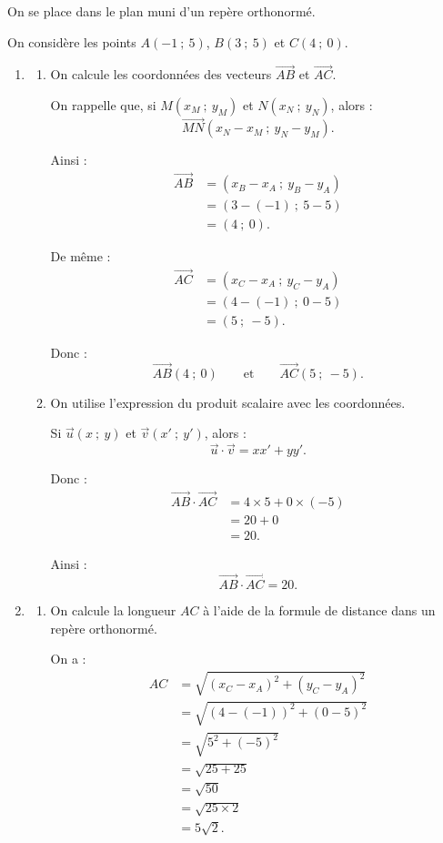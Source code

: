 On se place dans le plan muni d'un repère orthonormé.

On considère les points $A(-1\ ;\ 5)$, $B(3\ ;\ 5)$ et $C(4\ ;\ 0)$.

\begin{enumerate}
\item \begin{enumerate}
\item On calcule les coordonnées des vecteurs $\overrightarrow{AB}$ et $\overrightarrow{AC}$.

On rappelle que, si $M(x_M\ ;\ y_M)$ et $N(x_N\ ;\ y_N)$, alors :
\[
\overrightarrow{MN}(x_N-x_M\ ;\ y_N-y_M).
\]

Ainsi :
\begin{align*}
\overrightarrow{AB}
&=(x_B-x_A\ ;\ y_B-y_A)\\
&=(3-(-1)\ ;\ 5-5)\\
&=(4\ ;\ 0).
\end{align*}

De même :
\begin{align*}
\overrightarrow{AC}
&=(x_C-x_A\ ;\ y_C-y_A)\\
&=(4-(-1)\ ;\ 0-5)\\
&=(5\ ;\ -5).
\end{align*}

Donc :
\[
\overrightarrow{AB}(4\ ;\ 0)
\qquad \text{et} \qquad
\overrightarrow{AC}(5\ ;\ -5).
\]

\item On utilise l'expression du produit scalaire avec les coordonnées.

Si $\vec u(x\ ;\ y)$ et $\vec v(x'\ ;\ y')$, alors :
\[
\vec u\cdot \vec v=xx'+yy'.
\]

Donc :
\begin{align*}
\overrightarrow{AB}\cdot\overrightarrow{AC}
&=4\times 5+0\times (-5)\\
&=20+0\\
&=20.
\end{align*}

Ainsi :
\[
\overrightarrow{AB}\cdot\overrightarrow{AC}=20.
\]
\end{enumerate}

\item \begin{enumerate}
\item On calcule la longueur $AC$ à l'aide de la formule de distance dans un repère orthonormé.

On a :
\begin{align*}
AC
&=\sqrt{(x_C-x_A)^2+(y_C-y_A)^2}\\
&=\sqrt{(4-(-1))^2+(0-5)^2}\\
&=\sqrt{5^2+(-5)^2}\\
&=\sqrt{25+25}\\
&=\sqrt{50}\\
&=\sqrt{25\times 2}\\
&=5\sqrt{2}.
\end{align*}


\end{enumerate}
\end{enumerate}
